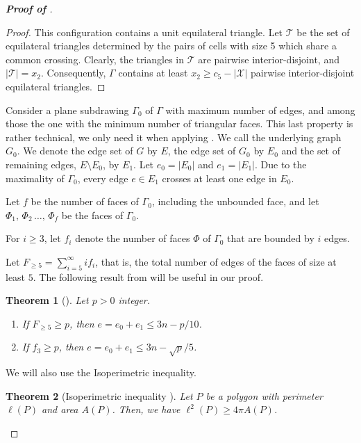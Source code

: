 \documentclass[10pt]{article}
\newtheorem{theorem}{Theorem}
\theoremstyle{definition}
\begin{document}
\begin{proof}[\bf Proof of ]
\begin{proof}
  
    This configuration contains a unit equilateral triangle. 
    Let $\mathcal{T}$ be the set of equilateral triangles 
    determined by the pairs of cells with size 5 which share a common crossing. 
    Clearly, the triangles in $\mathcal{T}$ are pairwise interior-disjoint, and $|\mathcal{T}|=x_2$. 
    Consequently, $\Gamma$ contains at least $x_2 \geq c_5- |\mathcal{X}|$ 
    pairwise interior-disjoint equilateral triangles.
\end{proof}



Consider a plane subdrawing $\Gamma_0$ of $\Gamma$ with maximum number of edges, and among those the one with the minimum number of triangular faces.
This last property is rather technical, we only need it when applying . We call the underlying graph $G_0$. We denote the edge set of $G$ by $E$, the edge set of $G_0$ by $E_0$ and the set of remaining edges, $E\setminus E_0$, by $E_1$. Let $e_0=|E_0|$ and $e_1=|E_1|$.
Due to the maximality of $\Gamma_0$, every edge $e \in E_1$ crosses at least one edge in $E_0$.

Let $f$ be the number of faces of $\Gamma_0$, including the unbounded face, and let $\Phi_1, \, \Phi_2 \, \dots, \, \Phi_f$ be the faces of $\Gamma_0$. 


For $i \ge 3$, let $f_i$ denote the number of faces $\Phi$ of $\Gamma_0$ that are bounded 
by $i$ edges. 

Let $F_{\ge 5} = \sum_{i=5}^{\infty} i f_i$, that is, the total number of edges of the faces of size at least $5$. The following result from \cite{GT25} will be useful in our proof.

\begin{theorem}[\!] \label{thm_GT1}  Let $p>0$ integer. 
\begin{enumerate}[label=(\roman*)] 
    \item\label{item1}  If $F_{\geq5}\geq p$,  
    then $e=e_0+e_1\leq3n-p/10$.

\item\label{item2} If $f_3\geq p$, 
then $e=e_0+e_1\leq3n-\sqrt{p}/5$.
\end{enumerate}
\end{theorem}

We will also use the Isoperimetric inequality.

\begin{theorem} [Isoperimetric inequality \cite{C13}] \label{thm_isoperimetric}
Let $P$ be a polygon with perimeter $\ell(P)$ and area $A(P)$. Then, we have $\ell^2(P)\ge 4\pi A(P)$.
\end{theorem}


\end{proof}
\end{document}
